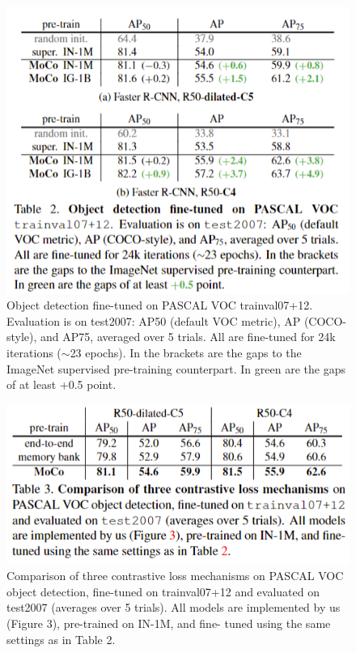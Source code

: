 \documentclass[10pt,twocolumn]{article}  %
\begin{document}
\begin{figure}[htbp]
    \centering
    \includegraphics[width=0.8\linewidth]{Pic/table2.png} %
    \caption{Object detection ﬁne-tuned on PASCAL VOC
    trainval07+12. Evaluation is on test2007: AP50 (default
    VOC metric), AP (COCO-style), and AP75, averaged over 5 trials.
    All are ﬁne-tuned for 24k iterations ($\sim $23 epochs). In the brackets
    are the gaps to the ImageNet supervised pre-training counterpart.
    In green are the gaps of at least +0.5 point.} %
    \label{fig:Table 2} %
\end{figure}
\begin{figure}[htbp]
    \centering
    \includegraphics[width=0.8\linewidth]{Pic/table3.png} %
    \caption{Comparison of three contrastive loss mechanisms on
    PASCAL VOC object detection, ﬁne-tuned on trainval07+12
    and evaluated on test2007 (averages over 5 trials). All models
    are implemented by us (Figure 3), pre-trained on IN-1M, and ﬁne-
    tuned using the same settings as in Table 2.} %
    \label{fig:Table 3} %
\end{figure}
\end{document}
